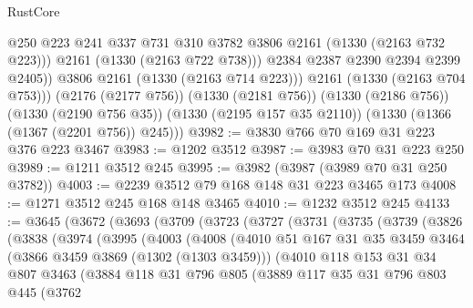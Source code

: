 \begin{lexlean}{RustCore}
\begin{coremodule}
                  @250
                  @223
                  @241
                  @337
                  @731
                  @310
                  @3782
                  @3806
                  @2161
                  (@1330 (@2163 @732 @223)))
                @2161
                (@1330 (@2163 @722 @738)))
              @2384
              @2387
              @2390
              @2394
              @2399
              @2405))
          @3806
          @2161
          (@1330 (@2163 @714 @223)))
        @2161
        (@1330 (@2163 @704 @753)))
      (@2176 (@2177 @756))
      (@1330 (@2181 @756))
      (@1330 (@2186 @756))
      (@1330 (@2190 @756 @35))
      (@1330 (@2195 @157 @35 @2110))
      (@1330 (@1366 (@1367 (@2201 @756)) @245)))
@3982 := @3830 @766 @70 @169 @31 @223 @376 @223 @3467
@3983 := @1202 @3512
@3987 := @3983 @70 @31 @223 @250
@3989 := @1211 @3512 @245
@3995 := @3982 (@3987 (@3989 @70 @31 @250 @3782))
@4003 := @2239 @3512 @79 @168 @148 @31 @223 @3465 @173
@4008 := @1271 @3512 @245 @168 @148 @3465
@4010 := @1232 @3512 @245
@4133 := @3645
    (@3672
      (@3693
        (@3709
          (@3723
            (@3727
              (@3731
                (@3735
                  (@3739
                    (@3826
                      (@3838
                        (@3974
                          (@3995
                            (@4003
                              (@4008
                                (@4010
                                  @51
                                  @167
                                  @31
                                  @35
                                  @3459
                                  @3464
                                  (@3866 @3459 @3869 (@1302 (@1303 @3459)))
                                  (@4010
                                    @118
                                    @153
                                    @31
                                    @34
                                    @807
                                    @3463
                                    (@3884
                                      @118
                                      @31
                                      @796
                                      @805
                                      (@3889
                                        @117
                                        @35
                                        @31
                                        @796
                                        @803
                                        @445
                                        (@3762

\end{coremodule}
\end{lexlean}
